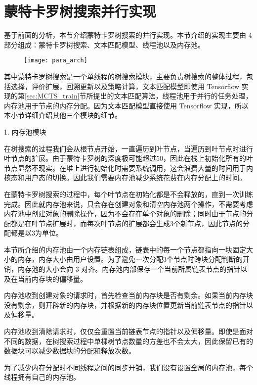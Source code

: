 \section{蒙特卡罗树搜索并行实现}
基于前面的分析，本节介绍蒙特卡罗树搜索的并行实现。本节介绍的实现主要由 4 部分组成：蒙特卡罗树搜索、文本匹配模型、线程池以及内存池。

\begin{figure}[!htbp]
    \centering
    \texttt{[image: para\_arch]}
    \label{fig:tensorflow_para}
\end{figure}

其中蒙特卡罗树搜索是一个单线程的树搜索模块，主要负责树搜索的整体过程，包括选择，评价扩展，回溯更新以及策略计算，文本匹配模型即使用 Tensorflow 实现的第\ref{sec:MCTS_train}节所提出的文本匹配算法，线程池用于并行的任务处理，内存池用于节点的内存分配。因为文本匹配模型直接使用 Tensorflow 实现，所以本小节详细介绍其他三个模块的细节。

1. 内存池模块

在树搜索的过程我们会从根节点开始，一直遍历到叶节点，当遍历到叶节点时进行叶节点的扩展。由于蒙特卡罗树的深度极可能超过50，因此在栈上初始化所有的叶节点显然不现实。在堆上进行初始化时需要系统调用，这会浪费大量的时间用于内核态和用户态的切换。因此我们需要内存池减少系统花费在内存分配上的时间。

在蒙特卡罗树搜索的过程中，每个叶节点在初始化都是不会释放的，直到一次训练完成。因此就内存池来说，只会存在创建对象和清空内存池两个操作，不需要考虑内存池中创建对象的删除操作，因为不会存在单个对象的删除；同时由于节点的分配都是在叶节点扩展时，而每次叶节点的扩展都会生成3个新节点，因此节点的分配都是以3为单位。

本节所介绍的内存池由一个内存链表组成，链表中的每一个节点都指向一块固定大小的内存，内存大小由用户设置。为了避免一次分配3个节点时跨块分配判断的开销，内存池的大小会向 3 对齐。内存池内部保存一个当前所属链表节点的指针以及在当前内存块的偏移量。

内存池收到创建对象的请求时，首先检查当前内存块是否有剩余。如果当前内存块没有剩余，则开辟新的内存块，并根据新的内存块位置更新当前链表节点的指针以及偏移量。

内存池收到清除请求时，仅仅会重置当前链表节点的指针以及偏移量。即使是面对不同的数据，在树搜索过程中单棵树节点数量的方差也不会太大，因此保留已有的数据块可以减少数据块的分配和释放次数。

为了减少内存分配时不同线程之间的同步开销，我们没有设置全局的内存池，每个线程拥有自己的内存池。

